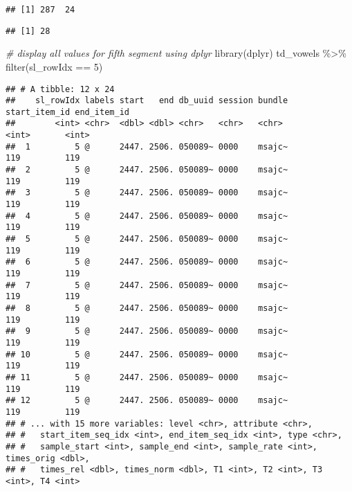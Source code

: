 \documentclass[
]{book}
\newenvironment{Shaded}{\begin{snugshade}}{\end{snugshade}}
\newcommand{\CommentTok}[1]{\textcolor[rgb]{0.56,0.35,0.01}{\textit{#1}}}
\newcommand{\DecValTok}[1]{\textcolor[rgb]{0.00,0.00,0.81}{#1}}
\newcommand{\FunctionTok}[1]{\textcolor[rgb]{0.00,0.00,0.00}{#1}}
\newcommand{\NormalTok}[1]{#1}
\newcommand{\SpecialCharTok}[1]{\textcolor[rgb]{0.00,0.00,0.00}{#1}}
\begin{document}
\begin{verbatim}
## [1] 287  24
\end{verbatim}

\begin{Shaded}
\end{Shaded}

\begin{verbatim}
## [1] 28
\end{verbatim}

\begin{Shaded}
\begin{Highlighting}[]
\CommentTok{\# display all values for fifth segment using dplyr}
\FunctionTok{library}\NormalTok{(dplyr)}
\NormalTok{td\_vowels }\SpecialCharTok{\%\textgreater{}\%} \FunctionTok{filter}\NormalTok{(sl\_rowIdx }\SpecialCharTok{==} \DecValTok{5}\NormalTok{)}
\end{Highlighting}
\end{Shaded}

\begin{verbatim}
## # A tibble: 12 x 24
##    sl_rowIdx labels start   end db_uuid session bundle start_item_id end_item_id
##        <int> <chr>  <dbl> <dbl> <chr>   <chr>   <chr>          <int>       <int>
##  1         5 @      2447. 2506. 050089~ 0000    msajc~           119         119
##  2         5 @      2447. 2506. 050089~ 0000    msajc~           119         119
##  3         5 @      2447. 2506. 050089~ 0000    msajc~           119         119
##  4         5 @      2447. 2506. 050089~ 0000    msajc~           119         119
##  5         5 @      2447. 2506. 050089~ 0000    msajc~           119         119
##  6         5 @      2447. 2506. 050089~ 0000    msajc~           119         119
##  7         5 @      2447. 2506. 050089~ 0000    msajc~           119         119
##  8         5 @      2447. 2506. 050089~ 0000    msajc~           119         119
##  9         5 @      2447. 2506. 050089~ 0000    msajc~           119         119
## 10         5 @      2447. 2506. 050089~ 0000    msajc~           119         119
## 11         5 @      2447. 2506. 050089~ 0000    msajc~           119         119
## 12         5 @      2447. 2506. 050089~ 0000    msajc~           119         119
## # ... with 15 more variables: level <chr>, attribute <chr>,
## #   start_item_seq_idx <int>, end_item_seq_idx <int>, type <chr>,
## #   sample_start <int>, sample_end <int>, sample_rate <int>, times_orig <dbl>,
## #   times_rel <dbl>, times_norm <dbl>, T1 <int>, T2 <int>, T3 <int>, T4 <int>
\end{verbatim}
\end{document}
